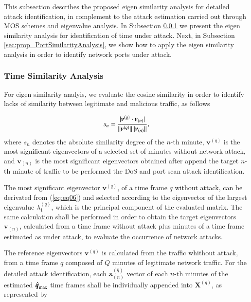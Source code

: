 \documentclass[review]{elsarticle}
\DeclarePairedDelimiter\abs{\lvert}{\rvert}%
\DeclarePairedDelimiter\norm{\lVert}{\rVert}%
\providecommand{\DIFaddtex}[1]{{\protect\color{blue}\uwave{#1}}} %
\providecommand{\DIFdeltex}[1]{{\protect\color{red}\sout{#1}}}                      %
\providecommand{\DIFaddbegin}{} %
\providecommand{\DIFaddend}{} %
\providecommand{\DIFdelbegin}{} %
\providecommand{\DIFdelend}{} %
\providecommand{\DIFadd}[1]{\texorpdfstring{\DIFaddtex{#1}}{#1}} %
\providecommand{\DIFdel}[1]{\texorpdfstring{\DIFdeltex{#1}}{}} %
\begin{document}
This subsection describes the proposed eigen similarity analysis for detailed attack identification, in complement to the attack estimation carried out through MOS schemes and eigenvalue analysis. In Subsection \ref{sec:prop_TimeSimilarityAnalysis} we present the eigen similarity analysis for identification of time under attack. Next, in Subsection \ref{sec:prop_PortSimilarityAnalysis}, we show how to apply the eigen similarity analysis in order to identify network ports under attack.

\subsubsection{Time Similarity Analysis}
\label{sec:prop_TimeSimilarityAnalysis}

For eigen similarity analyis, we evaluate the cosine similarity in order to identify lacks of similarity between legitimate and malicious traffic, as follows

\begin{equation}\label{eq:eq11}
s_n = \frac{\abs{\boldsymbol{v}^{(q)} \cdot \boldsymbol{v}_{(n)}}}{\norm{\boldsymbol{v}^{(q)}}\norm{\boldsymbol{v}_{(n)}}},
\end{equation}
where $s_n$ denotes the absolute similarity degree of the $n$-th minute, $\boldsymbol{v}^{(q)}$ is the most significant eigenvectors of a selected set of minutes without network attack, and $\boldsymbol{v}_{(n)}$ is the most significant eigenvectors obtained after append the target $n$-th minute of traffic to be performed the \DIFdelbegin \DIFdel{DoS }\DIFdelend \DIFaddbegin \DIFadd{flood }\DIFaddend and port scan attack identification.

The most significant eigenvector $\boldsymbol{v}^{(q)}$, of a time frame $q$ without attack, can be derivated from (\ref{eq:eq06}) and selected according to the eigenvector of the largest eigenvalue $\lambda_1^{(q)}$, which is the principal component of the evaluated matrix. The same calculation shall be performed in order to obtain the target eigenvectors $\boldsymbol{v}_{(n)}$, calculated from a time frame without attack plus minutes of a time frame estimated as under attack, to evaluate the occurrence of network attacks. 

The reference eigenvectors $\boldsymbol{v}^{(q)}$ is calculated from the traffic whithout attack, from a time frame $q$ composed of $Q$ minutes of legitimate network traffic. For the detailed attack identification, each $\boldsymbol{x}^{(\hat{q})}_{(n)}$ vector of each $n$-th minutes of the estimated $\rm{\boldsymbol{\hat{q}}}_{\rm max}$ time frames shall be individually appended into $\boldsymbol{X}^{(q)}$, as represented by
\end{document}
